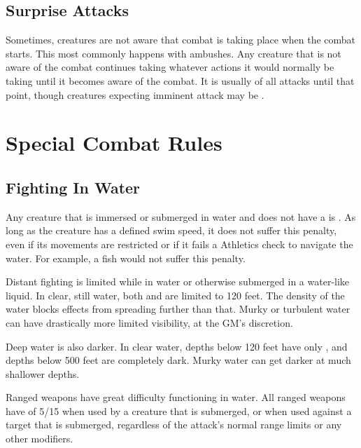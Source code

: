   \subsection{Surprise Attacks}\label{Surprise Attacks}
    Sometimes, creatures are not aware that combat is taking place when the combat starts.
    This most commonly happens with ambushes.
    Any creature that is not aware of the combat continues taking whatever actions it would normally be taking until it becomes aware of the combat.
    It is usually \unaware of all attacks until that point, though creatures expecting imminent attack may be \partiallyunaware.

\section{Special Combat Rules}

  \subsection{Fighting In Water}\label{Fighting In Water}
    Any creature that is immersed or submerged in water and does not have a  is \unsteady.
    As long as the creature has a defined swim speed, it does not suffer this penalty, even if its movements are restricted or if it fails a Athletics check to navigate the water.
    For example, a \grappled fish would not suffer this penalty.

    Distant fighting is limited while in water or otherwise submerged in a water-like liquid.
    In clear, still water, both  and  are limited to 120 feet.
    The density of the water blocks effects from spreading further than that.
    Murky or turbulent water can have drastically more limited visibility, at the GM's discretion.

    Deep water is also darker.
    In clear water, depths below 120 feet have only , and depths below 500 feet are completely dark.
    Murky water can get darker at much shallower depths.

    Ranged weapons have great difficulty functioning in water.
    All ranged weapons have  of 5/15 when used by a creature that is submerged, or when used against a target that is submerged, regardless of the attack's normal range limits or any other modifiers.

